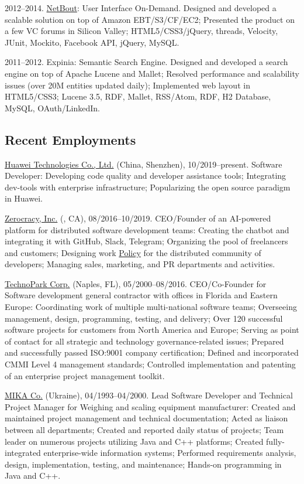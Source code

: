\documentclass{yb}
\renewcommand\emph[1]{#1}
\begin{document}
2012--2014. \href{https://www.netbout.com}{\emph{NetBout}}: User Interface On-Demand.
Designed and developed a scalable solution on top of Amazon EBT/S3/CF/EC2;
Presented the product on a few VC forums in Silicon Valley;
HTML5/CSS3/jQuery, threads, Velocity, JUnit, Mockito, Facebook API, jQuery, MySQL.

2011--2012. \emph{Expinia}: Semantic Search Engine.
Designed and developed a search engine on top of Apache Lucene and Mallet;
Resolved performance and scalability issues (over 20M entities updated daily);
Implemented web layout in HTML5/CSS3;
Lucene 3.5, RDF, Mallet, RSS/Atom, RDF, H2 Database, MySQL, OAuth/LinkedIn.

\subsection*{Recent Employments}

\emph{\href{https://www.huawei.com}{Huawei Technologies Co., Ltd.}} (China, Shenzhen), 10/2019--present.
Software Developer:
Developing code quality and developer assistance tools;
Integrating dev-tools with enterprise infrastructure;
Popularizing the open source paradigm in Huawei.

\emph{\href{https://www.zerocracy.com}{Zerocracy, Inc.}} (, CA), 08/2016--10/2019.
CEO/Founder of an AI-powered platform for distributed software development teams:
Creating the chatbot and integrating it with GitHub, Slack, Telegram;
Organizing the pool of freelancers and customers;
Designing work \href{https://www.zerocracy.com/how-it-works}{Policy} for the distributed community of developers;
Managing sales, marketing, and PR departments and activities.

\emph{\href{https://www.technoparkcorp.com}{TechnoPark Corp.}} (Naples, FL), 05/2000--08/2016.
CEO/Co-Founder for Software development general contractor with offices in Florida and Eastern Europe:
Coordinating work of multiple multi-national software teams;
Overseeing management, design, programming, testing, and delivery;
Over 120 successful software projects for customers from North America and Europe;
Serving as point of contact for all strategic and technology governance-related issues;
Prepared and successfully passed ISO:9001 company certification;
Defined and incorporated CMMI Level 4 management standards;
Controlled implementation and patenting of an enterprise project management toolkit.

\emph{\href{https://www.mika.ua}{MIKA Co.}} (Ukraine), 04/1993--04/2000.
Lead Software Developer and Technical Project Manager for Weighing and scaling equipment manufacturer:
Created and maintained project management and technical documentation;
Acted as liaison between all departments;
Created and reported daily status of projects;
Team leader on numerous projects utilizing Java and C++ platforms;
Created fully-integrated enterprise-wide information systems;
Performed requirements analysis, design, implementation, testing, and maintenance;
Hands-on programming in Java and C++.
\end{document}
